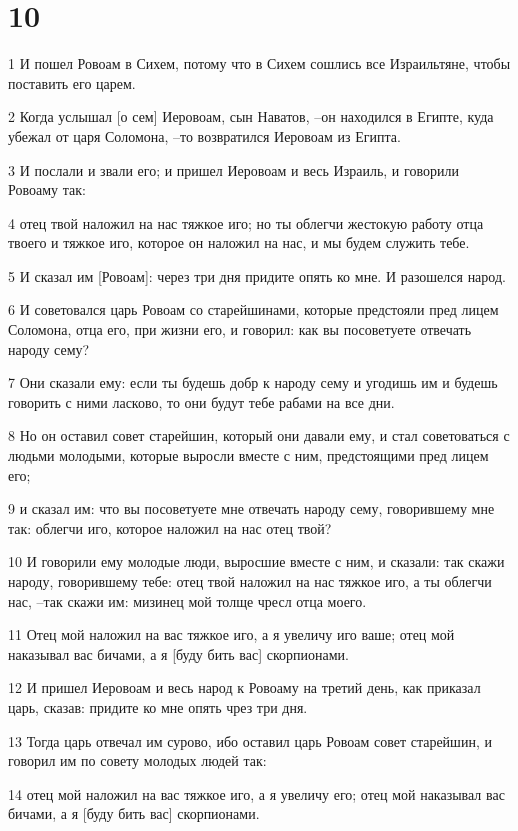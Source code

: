 \chapter{10}

\par 1 И пошел Ровоам в Сихем, потому что в Сихем сошлись все Израильтяне, чтобы поставить его царем.
\par 2 Когда услышал [о сем] Иеровоам, сын Наватов, --он находился в Египте, куда убежал от царя Соломона, --то возвратился Иеровоам из Египта.
\par 3 И послали и звали его; и пришел Иеровоам и весь Израиль, и говорили Ровоаму так:
\par 4 отец твой наложил на нас тяжкое иго; но ты облегчи жестокую работу отца твоего и тяжкое иго, которое он наложил на нас, и мы будем служить тебе.
\par 5 И сказал им [Ровоам]: через три дня придите опять ко мне. И разошелся народ.
\par 6 И советовался царь Ровоам со старейшинами, которые предстояли пред лицем Соломона, отца его, при жизни его, и говорил: как вы посоветуете отвечать народу сему?
\par 7 Они сказали ему: если ты будешь добр к народу сему и угодишь им и будешь говорить с ними ласково, то они будут тебе рабами на все дни.
\par 8 Но он оставил совет старейшин, который они давали ему, и стал советоваться с людьми молодыми, которые выросли вместе с ним, предстоящими пред лицем его;
\par 9 и сказал им: что вы посоветуете мне отвечать народу сему, говорившему мне так: облегчи иго, которое наложил на нас отец твой?
\par 10 И говорили ему молодые люди, выросшие вместе с ним, и сказали: так скажи народу, говорившему тебе: отец твой наложил на нас тяжкое иго, а ты облегчи нас, --так скажи им: мизинец мой толще чресл отца моего.
\par 11 Отец мой наложил на вас тяжкое иго, а я увеличу иго ваше; отец мой наказывал вас бичами, а я [буду бить вас] скорпионами.
\par 12 И пришел Иеровоам и весь народ к Ровоаму на третий день, как приказал царь, сказав: придите ко мне опять чрез три дня.
\par 13 Тогда царь отвечал им сурово, ибо оставил царь Ровоам совет старейшин, и говорил им по совету молодых людей так:
\par 14 отец мой наложил на вас тяжкое иго, а я увеличу его; отец мой наказывал вас бичами, а я [буду бить вас] скорпионами.
